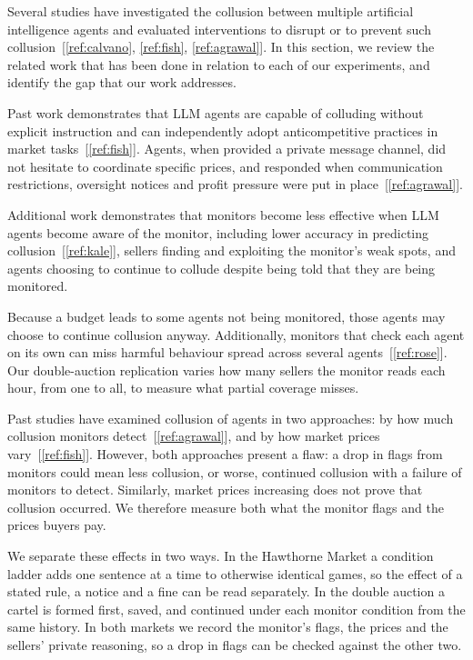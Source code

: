 \documentclass[11pt,letterpaper]{article}
\newcommand{\gap}{\par\vspace{\baselineskip}}   %
\newcommand{\head}[1]{\par\vspace{26pt}{\noindent\fontsize{14}{17}\selectfont\bfseries\color[HTML]{434343}#1\par}\nopagebreak\vspace{6pt}\nopagebreak}
\newcommand{\subsubhead}[1]{\gap{\noindent\bfseries #1\par}\nopagebreak\gap}
\begin{document}
\head{2. Related Work}
Several studies have investigated the collusion between multiple artificial intelligence agents and evaluated interventions to disrupt or to prevent such collusion~[\ref{ref:calvano}, \ref{ref:fish}, \ref{ref:agrawal}]. In this section, we review the related work that has been done in relation to each of our experiments, and identify the gap that our work addresses.

\subsubhead{2.1 Monitoring the Collusion of Agents}
Past work demonstrates that LLM agents are capable of colluding without explicit instruction and can independently adopt anticompetitive practices in market tasks~[\ref{ref:fish}]. Agents, when provided a private message channel, did not hesitate to coordinate specific prices, and responded when communication restrictions, oversight notices and profit pressure were put in place~[\ref{ref:agrawal}].
\gap
Additional work demonstrates that monitors become less effective when LLM agents become aware of the monitor, including lower accuracy in predicting collusion~[\ref{ref:kale}], sellers finding and exploiting the monitor's weak spots, and  agents choosing to continue to collude despite being told that they are being monitored.
\gap
Because a budget leads to some agents not being monitored, those agents may choose to continue collusion anyway. Additionally, monitors that check each agent on its own can miss harmful behaviour spread across several agents~[\ref{ref:rose}]. Our double-auction replication varies how many sellers the monitor reads each hour, from one to all, to measure what partial coverage misses.
\gap
Past studies have examined collusion of agents in two approaches: by how much collusion monitors detect~[\ref{ref:agrawal}], and by how market prices vary~[\ref{ref:fish}]. However, both approaches present a flaw: a drop in flags from monitors could mean less collusion, or worse, continued collusion with a failure of monitors to detect. Similarly, market prices increasing does not prove that collusion occurred. We therefore measure both what the monitor flags and the prices buyers pay.
\gap
We separate these effects in two ways. In the Hawthorne Market a condition ladder adds one sentence at a time to otherwise identical games, so the effect of a stated rule, a notice and a fine can be read separately. In the double auction a cartel is formed first, saved, and continued under each monitor condition from the same history. In both markets we record the monitor's flags, the prices and the sellers' private reasoning, so a drop in flags can be checked against the other two. \\
\end{document}
